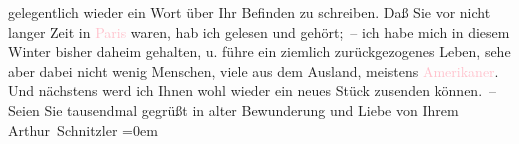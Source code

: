                    gelegentlich wieder ein Wort über Ihr Befinden zu schreiben. Daß Sie vor nicht
                    langer Zeit in \textcolor{pink}{Paris}{}\ledrightnote{\textcolor{pink}{Paris}} waren, hab ich gelesen und
                    gehört; – ich habe mich in diesem Winter bisher daheim gehalten, u. {\pb}führe ein ziemlich zurückgezogenes Leben,
                    sehe aber dabei nicht wenig Menschen, viele aus dem Ausland, meistens \textcolor{pink}{Amerikaner}{}\ledrightnote{\textcolor{pink}{Amerika}}. Und nächstens werd ich Ihnen wohl
                    wieder ein neues Stück zusenden können. –\pend
           \pstart
           Seien Sie tausendmal gegrüßt in alter Bewunderung und Liebe von Ihrem{\\[\baselineskip]}\spacefill\mbox{Arthur Schnitzler}\pend
           \leftskip=0em{}\endnumbering{}  
      